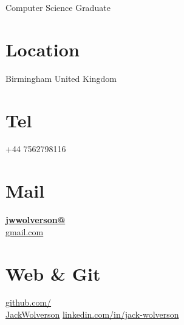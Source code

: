 \documentclass[]{friggeri-cv}
\begin{document}
      {Computer Science Graduate}
      

\begin{aside}
  \section{Location}
    Birmingham
    United Kingdom
    ~
  \section{Tel}
    +44 7562798116
    ~
  \section{Mail}
    \href{mailto:jwwolverson@gmail.com}{\textbf{jwwolverson@}\\gmail.com}
    ~
  \section{Web \& Git}
    \href{http://github.com/JackWolverson}{github.com/\\JackWolverson}
    \href{https://www.linkedin.com/in/jack-wolverson/}{linkedin.com/in/jack-wolverson}
    ~

\end{aside}
\end{document}
